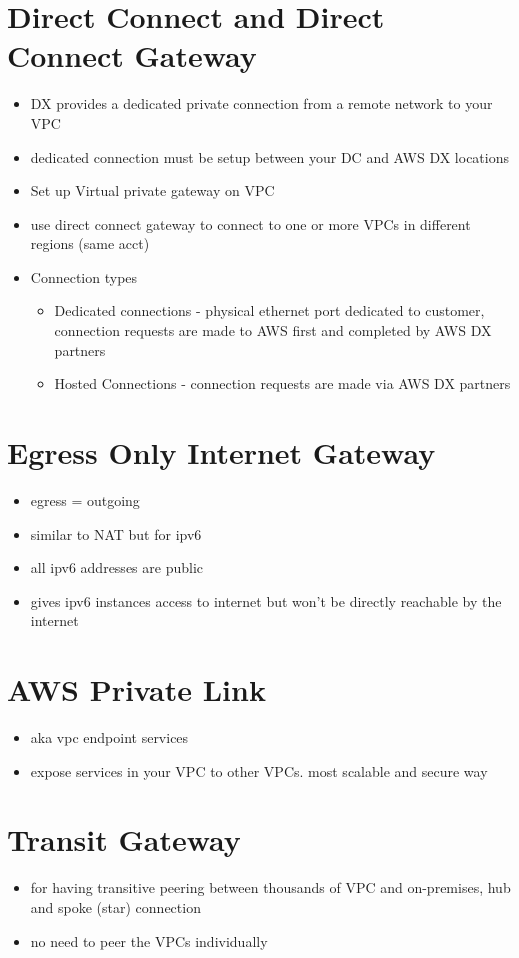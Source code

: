 \documentclass[]{scrartcl}
\begin{document}
\section{Direct Connect and Direct Connect Gateway}
\begin{itemize}
	\item DX provides a dedicated private connection from a remote network to your VPC
	\item dedicated connection must be setup between your DC and AWS DX locations
	\item Set up Virtual private gateway on VPC
	\item use direct connect gateway to connect to one or more VPCs in different regions (same acct)
	\item Connection types
	\begin{itemize}
		\item Dedicated connections - physical ethernet port dedicated to customer, connection requests are made to AWS first and completed by AWS DX partners
		\item Hosted Connections - connection requests are made via AWS DX partners
	\end{itemize}
\end{itemize}

\section{Egress Only Internet Gateway}
\begin{itemize}
	\item egress = outgoing
	\item similar to NAT but for ipv6
	\item all ipv6 addresses are public
	\item gives ipv6 instances access to internet but won't be directly reachable by the internet
\end{itemize}

\section{AWS Private Link}
\begin{itemize}
	\item aka vpc endpoint services
	\item expose services in your VPC to other VPCs. most scalable and secure way
\end{itemize}

\section{Transit Gateway}
\begin{itemize}
	\item for having transitive peering between thousands of VPC and on-premises, hub and spoke (star) connection
	\item no need to peer the VPCs individually
\end{itemize}
\end{document}
